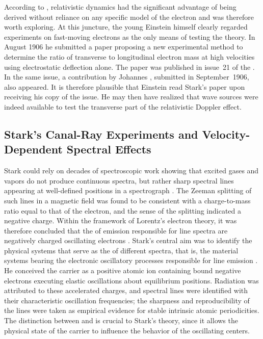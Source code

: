 \documentclass[submitted,12pt]{article}
\begin{document}
According to \citet{Planck1906}, relativistic dynamics had the significant advantage of being derived without reliance on any specific model of the electron and was therefore worth exploring. At this juncture, the young Einstein himself clearly regarded experiments on fast-moving electrons as the only means of testing the theory. In August 1906 he submitted a paper \citep{Einstein1906c} proposing a new experimental method to determine the ratio of transverse to longitudinal electron mass at high velocities using electrostatic deflection alone. The paper was published in issue~21 of the . In the same issue, a contribution by Johannes \citet{Stark1906}, submitted in September~1906, also appeared. It is therefore plausible that Einstein read Stark’s paper upon receiving his copy of the  issue. He may then have realized that wave sources were indeed available to test the transverse part of the relativistic Doppler effect.



\subsection{Stark’s Canal-Ray Experiments and Velocity-Dependent Spectral Effects\label{sub:stark}}
%
Stark could rely on decades of spectroscopic work showing that excited gases and vapors do not produce continuous spectra, but rather sharp spectral lines appearing at well-defined positions in a spectrograph \citep{Hentschel2002}. The Zeeman splitting of such lines in a magnetic field was found to be consistent with a charge-to-mass ratio equal to that of the electron, and the sense of the splitting indicated a negative charge. Within the framework of Lorentz’s electron theory, it was therefore concluded that the   of emission responsible for line spectra are negatively charged oscillating electrons \citep[401]{Stark1906}. Stark’s central aim was to identify the physical systems that serve as the   of different spectra, that is, the material systems bearing the electronic oscillatory processes responsible for line emission \citep[402]{Stark1906}. He conceived the carrier as a positive atomic ion containing bound negative electrons executing elastic oscillations about equilibrium positions. Radiation was attributed to these accelerated charges, and spectral lines were identified with their characteristic oscillation frequencies; the sharpness and reproducibility of the lines were taken as empirical evidence for stable intrinsic atomic periodicities. The distinction between  and  is crucial to Stark’s theory, since it allows the physical state of the carrier to influence the behavior of the oscillating centers.
\end{document}
